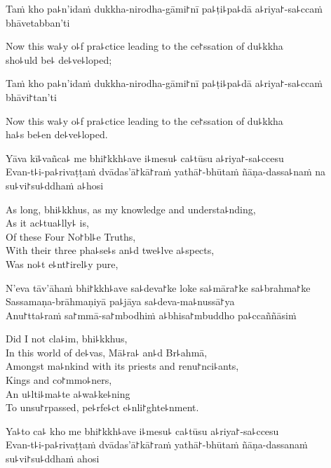 Taṁ kho pa꜕n'idaṁ dukkha-nirodha-gāmi꜓nī pa꜕ṭi꜕pa꜕dā a꜕riya꜓-sa꜕ccaṁ bhāvetabban'ti

\begin{english}
  Now this wa꜕y o꜕f pra꜕ctice leading to the ce꜓ssation of du꜕kkha\\
  sho꜕uld be꜕ de꜕ve꜕loped;
\end{english}

Taṁ kho pa꜕n'idaṁ dukkha-nirodha-gāmi꜓nī pa꜕ṭi꜕pa꜕dā a꜕riya꜓-sa꜕ccaṁ bhāvi꜓tan'ti

\begin{english}
  Now this wa꜕y o꜕f pra꜕ctice leading to the ce꜓ssation of du꜕kkha\\
  ha꜕s be꜕en de꜕ve꜕loped.
\end{english}

Yāva kī꜕vañca꜕ me bhi꜓kkh꜕ave i꜕mesu꜕ ca꜕tūsu a꜕riya꜓-sa꜕ccesu\\
Evan-t꜕i-pa꜕rivaṭṭaṁ dvādas'ā꜓kā꜓raṁ yathā꜓-bhūtaṁ ñāṇa-dassa꜕naṁ na su꜕vi꜓su꜕ddhaṁ a꜕hosi

\ifaivedition\relax\else
\clearpage
\fi

\begin{english}
  As long, bhi꜕kkhus, as my knowledge and understa꜕nding,\\
  As it ac꜕tua꜕lly꜕ is,\\
  Of these Four No꜓bl꜕e Truths,\\
  With their three pha꜕se꜕s an꜕d twe꜕lve a꜕spects,\\
  Was no꜕t e꜕nt꜓irel꜕y pure,
\end{english}

N'eva tāv'āhaṁ bhi꜓kkh꜕ave sa꜕deva꜓ke loke sa꜕māra꜓ke sa꜕brahma꜓ke\\
Sassamaṇa-brāhmaṇiyā pa꜕jāya sa꜕deva-ma꜕nussā꜓ya\\
Anu꜓tta꜕raṁ sa꜓mmā-sa꜓mbodhiṁ a꜕bhisa꜓mbuddho pa꜕ccaññāsiṁ

\begin{english}
  Did I not cla꜕im, bhi꜕kkhus,\\
  In this world of de꜕vas, Mā꜕ra꜕ an꜕d Br꜕ahmā,\\
  \ifaivedition
  \clearpage
  \fi
  Amongst ma꜕nkind with its priests and renu꜓nci꜕ants,\\
  Kings and co꜓mmo꜕ners,\\
  An u꜕lti꜕ma꜕te a꜕wa꜕ke꜕ning\\
  To unsu꜓rpassed, pe꜕rfe꜕ct e꜕nli꜓ghte꜕nment.
\end{english}

Ya꜕to ca꜕ kho me bhi꜓kkh꜕ave i꜕mesu꜕ ca꜕tūsu a꜕riya꜓-sa꜕ccesu\\
Evan-t꜕i-pa꜕rivaṭṭaṁ dvādas'ā꜓kā꜓raṁ yathā꜓-bhūtaṁ ñāṇa-dassanaṁ su꜕vi꜓su꜕ddhaṁ ahosi

